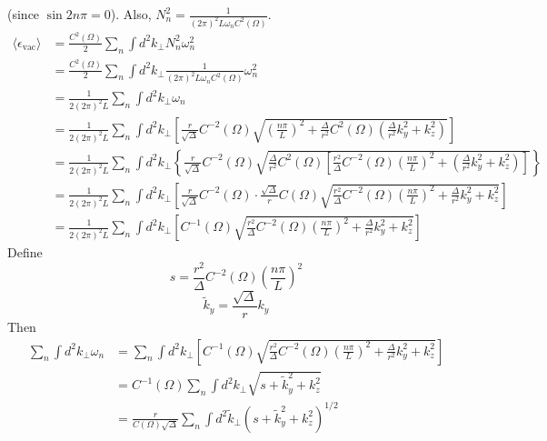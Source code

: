 \documentclass[english]{article}
\begin{document}
(since $\sin2n\pi=0$). Also, $N^{2}_{n}=\frac{1}{\left(2\pi\right)^{2}L\omega_{n}C^{2}\left(\Omega\right)}$.
\begin{align*}
\langle\epsilon_{\text{vac}}\rangle & =\frac{C^{2}\left(\Omega\right)}{2}\sum_{n}\int d^{2}k_{\perp}N^{2}_{n}\omega^{2}_{n}\\
 & =\frac{C^{2}\left(\Omega\right)}{2}\sum_{n}\int d^{2}k_{\perp}\frac{1}{\left(2\pi\right)^{2}L\omega_{n}C^{2}\left(\Omega\right)}\omega^{2}_{n}\\
 & =\frac{1}{2\left(2\pi\right)^{2}L}\sum_{n}\int d^{2}k_{\perp}\omega_{n}\\
 & =\frac{1}{2\left(2\pi\right)^{2}L}\sum_{n}\int d^{2}k_{\perp}\left[\frac{r}{\sqrt{\Delta}}C^{-2}\left(\Omega\right)\sqrt{\left(\frac{n\pi}{L}\right)^{2}+\frac{\Delta}{r^{2}}C^{2}\left(\Omega\right)\left(\frac{\Delta}{r^{2}}k^{2}_{y}+k^{2}_{z}\right)}\right]\\
 & =\frac{1}{2\left(2\pi\right)^{2}L}\sum_{n}\int d^{2}k_{\perp}\left\{ \frac{r}{\sqrt{\Delta}}C^{-2}\left(\Omega\right)\sqrt{\frac{\Delta}{r^{2}}C^{2}\left(\Omega\right)\left[\frac{r^{2}}{\Delta}C^{-2}\left(\Omega\right)\left(\frac{n\pi}{L}\right)^{2}+\left(\frac{\Delta}{r^{2}}k^{2}_{y}+k^{2}_{z}\right)\right]}\right\} \\
 & =\frac{1}{2\left(2\pi\right)^{2}L}\sum_{n}\int d^{2}k_{\perp}\left[\frac{r}{\sqrt{\Delta}}C^{-2}\left(\Omega\right)\cdot\frac{\sqrt{\Delta}}{r}C\left(\Omega\right)\sqrt{\frac{r^{2}}{\Delta}C^{-2}\left(\Omega\right)\left(\frac{n\pi}{L}\right)^{2}+\frac{\Delta}{r^{2}}k^{2}_{y}+k^{2}_{z}}\right]\\
 & =\frac{1}{2\left(2\pi\right)^{2}L}\sum_{n}\int d^{2}k_{\perp}\left[C^{-1}\left(\Omega\right)\sqrt{\frac{r^{2}}{\Delta}C^{-2}\left(\Omega\right)\left(\frac{n\pi}{L}\right)^{2}+\frac{\Delta}{r^{2}}k^{2}_{y}+k^{2}_{z}}\right]
\end{align*}
 Define 
\[
s=\frac{r^{2}}{\Delta}C^{-2}\left(\Omega\right)\left(\frac{n\pi}{L}\right)^{2}
\]
 {}
\[
\tilde{k}_{y}=\frac{\sqrt{\Delta}}{r}k_{y}
\]
 Then 
\begin{align*}
\sum_{n}\int d^{2}k_{\perp}\omega_{n} & =\sum_{n}\int d^{2}k_{\perp}\left[C^{-1}\left(\Omega\right)\sqrt{\frac{r^{2}}{\Delta}C^{-2}\left(\Omega\right)\left(\frac{n\pi}{L}\right)^{2}+\frac{\Delta}{r^{2}}k^{2}_{y}+k^{2}_{z}}\right]\\
 & =C^{-1}\left(\Omega\right)\sum_{n}\int d^{2}k_{\perp}\sqrt{s+\tilde{k}^{2}_{y}+k^{2}_{z}}\\
 & =\frac{r}{C\left(\Omega\right)\sqrt{\Delta}}\sum_{n}\int d^{2}\tilde{k}_{\perp}\left(s+\tilde{k}^{2}_{y}+k^{2}_{z}\right)^{1/2}
\end{align*}
\end{document}
